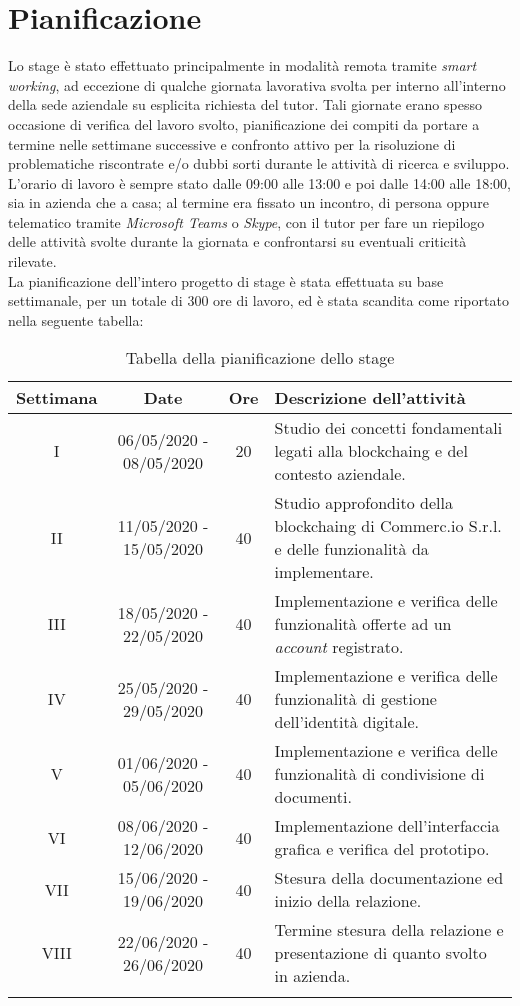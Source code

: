 \section{Pianificazione}

Lo stage è stato effettuato principalmente in modalità remota tramite \textit{smart working}, ad eccezione di qualche giornata lavorativa svolta per interno all'interno della sede aziendale su esplicita richiesta del tutor. Tali giornate erano spesso occasione di verifica del lavoro svolto, pianificazione dei compiti da portare a termine nelle settimane successive e confronto attivo per la risoluzione di problematiche riscontrate e/o dubbi sorti durante le attività di ricerca e sviluppo.\\
L'orario di lavoro è sempre stato dalle 09:00 alle 13:00 e poi dalle 14:00 alle 18:00, sia in azienda che a casa; al termine era fissato un incontro, di persona oppure telematico tramite \textit{Microsoft Teams} o \textit{Skype}, con il tutor per fare un riepilogo delle attività svolte durante la giornata e confrontarsi su eventuali criticità rilevate.\\
La pianificazione dell'intero progetto di stage è stata effettuata su base settimanale, per un totale di 300 ore di lavoro, ed è stata scandita come riportato nella seguente tabella:

\begin{longtable}{|c|c|c|p{5cm}|}
	\hline
	\rowcolor{gray}
	\textbf{Settimana} & \textbf{Date} & \textbf{Ore} & \textbf{Descrizione dell'attività} \\\hline
	I & 06/05/2020 - 08/05/2020 & 20 & Studio dei concetti fondamentali legati alla \gls{blockchaing} e del contesto aziendale. \\\hline
	II & 11/05/2020 - 15/05/2020 & 40 & Studio approfondito della \gls{blockchaing} di Commerc.io S.r.l. e delle funzionalità da implementare. \\\hline
	III & 18/05/2020 - 22/05/2020 & 40 & Implementazione e verifica delle funzionalità offerte ad un \textit{account} registrato. \\\hline
	IV & 25/05/2020 - 29/05/2020 & 40 & Implementazione e verifica delle funzionalità di gestione dell'identità digitale. \\\hline
	V & 01/06/2020 - 05/06/2020 & 40 & Implementazione e verifica delle funzionalità di condivisione di documenti. \\\hline
	VI & 08/06/2020 - 12/06/2020 & 40 & Implementazione dell'interfaccia grafica e verifica del prototipo. \\\hline
	VII & 15/06/2020 - 19/06/2020 & 40 & Stesura della documentazione ed inizio della relazione. \\\hline
	VIII & 22/06/2020 - 26/06/2020 & 40 & Termine stesura della relazione e presentazione di quanto svolto in azienda. \\\hline
	
	\caption{Tabella della pianificazione dello stage}
	\label{tab:pianificazione}
\end{longtable}

